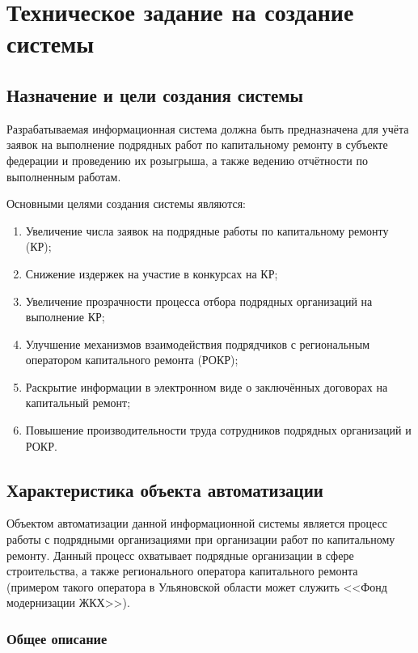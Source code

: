 \section{Техническое задание на создание системы}

\subsection{Назначение и цели создания системы}

Разрабатываемая информационная система должна быть предназначена для учёта заявок на выполнение подрядных работ по капитальному ремонту в субъекте федерации и проведению их розыгрыша, а также ведению отчётности по выполненным работам.

Основными целями создания системы являются:

\begin{enumerate}
	\item Увеличение числа заявок на подрядные работы по капитальному ремонту (КР);
	\item Снижение издержек на участие в конкурсах на КР;
	\item Увеличение прозрачности процесса отбора подрядных организаций на выполнение КР;
	\item Улучшение механизмов взаимодействия подрядчиков с региональным оператором капитального ремонта (РОКР);
	\item Раскрытие информации в электронном виде о заключённых договорах на капитальный ремонт;
	\item Повышение производительности труда сотрудников подрядных организаций и РОКР.
\end{enumerate}

\subsection{Характеристика объекта автоматизации}

Объектом автоматизации данной информационной системы является процесс работы с подрядными организациями при организации работ по капитальному ремонту.
Данный процесс охватывает подрядные организации в сфере строительства, а также регионального оператора капитального ремонта (примером такого оператора в Ульяновской области может служить <<Фонд модернизации ЖКХ>>).

\subsubsection{Общее описание}

